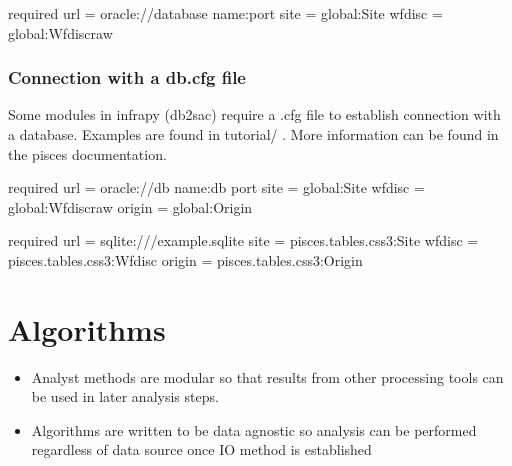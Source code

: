 \documentclass[letterpaper,10pt,english]{sphinxmanual}
\begin{document}

\begin{sphinxVerbatim}[commandchars=\\\{\}]
[database] \PYGZsh{} required
url = oracle://\PYGZlt{}database name\PYGZgt{}:\PYGZlt{}port\PYGZgt{}
site = global\PYGZus{}:Site
wfdisc = global\PYGZus{}:Wfdisc\PYGZus{}raw
\end{sphinxVerbatim}


\subsubsection{Connection with a db.cfg file}
\label{\detokenize{pisces:connection-with-a-db-cfg-file}}
Some modules in infrapy (db2sac) require a .cfg file to establish connection with a database.  Examples are found in tutorial/ . More information can be found in the pisces documentation.


\begin{sphinxVerbatim}[commandchars=\\\{\}]
[database] \PYGZsh{} required
url = oracle://\PYGZlt{}db name\PYGZgt{}:\PYGZlt{}db port\PYGZgt{}
site = global\PYGZus{}:Site
wfdisc = global\PYGZus{}:Wfdisc\PYGZus{}raw
origin = global\PYGZus{}:Origin
\end{sphinxVerbatim}


\begin{sphinxVerbatim}[commandchars=\\\{\}]
[database] \PYGZsh{} required
url = sqlite:///example.sqlite
site = pisces.tables.css3:Site
wfdisc = pisces.tables.css3:Wfdisc
origin = pisces.tables.css3:Origin
\end{sphinxVerbatim}


\section{Algorithms}
\label{\detokenize{algorithms:algorithms}}\label{\detokenize{algorithms:id1}}\label{\detokenize{algorithms::doc}}\begin{itemize}
\item {} 
Analyst methods are modular so that results from other processing tools can be used in later analysis steps.

\item {} 
Algorithms are written to be data agnostic so analysis can be performed regardless of data source once IO method is established

\end{itemize}
\end{document}
